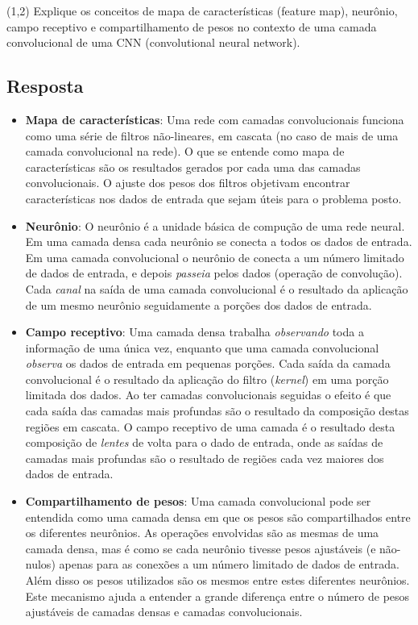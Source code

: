 \documentclass[final,3p]{elsarticle}
\numberwithin{equation}{section}
\begin{document}
    (1,2) Explique os conceitos de mapa de características (feature map), neurônio, campo receptivo e compartilhamento de pesos no contexto de uma camada convolucional de uma CNN (convolutional neural network).

    \subsection{Resposta}

        \begin{itemize}
            \item \textbf{Mapa de características}: Uma rede com camadas convolucionais funciona como uma série de filtros não-lineares, em cascata (no caso de mais de uma camada convolucional na rede). O que se entende como mapa de características são os resultados gerados por cada uma das camadas convolucionais. O ajuste dos pesos dos filtros objetivam encontrar características nos dados de entrada que sejam úteis para o problema posto.
            \item \textbf{Neurônio}: O neurônio é a unidade básica de compução de uma rede neural. Em uma camada densa cada neurônio se conecta a todos os dados de entrada. Em uma camada convolucional o neurônio de conecta a um número limitado de dados de entrada, e depois \emph{passeia} pelos dados (operação de convolução). Cada \emph{canal} na saída de uma camada convolucional é o resultado da aplicação de um mesmo neurônio seguidamente a porções dos dados de entrada.
            \item \textbf{Campo receptivo}: Uma camada densa trabalha \emph{observando} toda a informação de uma única vez, enquanto que uma camada convolucional \emph{observa} os dados de entrada em pequenas porções. Cada saída da camada convolucional é o resultado da aplicação do filtro (\emph{kernel}) em uma porção limitada dos dados. Ao ter camadas convolucionais seguidas o efeito é que cada saída das camadas mais profundas são o resultado da composição destas regiões em cascata. O campo receptivo de uma camada é o resultado desta composição de \emph{lentes} de volta para o dado de entrada, onde as saídas de camadas mais profundas são o resultado de regiões cada vez maiores dos dados de entrada.
            \item \textbf{Compartilhamento de pesos}: Uma camada convolucional pode ser entendida como uma camada densa em que os pesos são compartilhados entre os diferentes neurônios. As operações envolvidas são as mesmas de uma camada densa, mas é como se cada neurônio tivesse pesos ajustáveis (e não-nulos) apenas para as conexões a um número limitado de dados de entrada. Além disso os pesos utilizados são os mesmos entre estes diferentes neurônios. Este mecanismo ajuda a entender a grande diferença entre o número de pesos ajustáveis de camadas densas e camadas convolucionais.
        \end{itemize}
\end{document}
